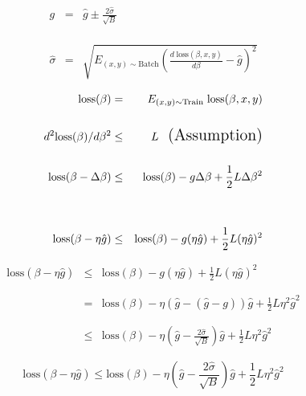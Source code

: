 {{\vfill
\begin{eqnarray*}
  g & = & \hat{g} \pm \frac{2\hat{\sigma}}{\sqrt{B}} \\
  \\
  \\
  \\
  \hat{\sigma} & = & \sqrt{E_{(x,y) \sim \mathrm{Batch}} \left(\frac{d\;\mathrm{loss}(\beta,x,y)}{d \beta} - \hat{g}\right)^2}
\end{eqnarray*}


\begin{eqnarray*}
  \mathrm{loss}(\beta) & = & E_{(x,y) \sim \mathrm{Train}}\;\mathrm{loss}(\beta,x,y) \\
  \\
  d^2 \mathrm{loss}(\beta)/d \beta^2 & \leq & L \;\;\;\mbox{\Large (Assumption)} \\
  \\
  \mathrm{loss}(\beta - \Delta\beta) & \leq & \mathrm{loss}(\beta) - g\Delta \beta + \frac{1}{2}L\Delta \beta^2 \\
  \\
  \\
  \mathrm{loss}(\beta - \eta\hat{g}) & \leq & \mathrm{loss}(\beta) - g(\eta\hat{g}) + \frac{1}{2}L(\eta\hat{g})^2
\end{eqnarray*}


\begin{eqnarray*}
  \mathrm{loss}(\beta - \eta\hat{g}) & \leq & \mathrm{loss}(\beta) - g(\eta\hat{g}) + \frac{1}{2}L(\eta\hat{g})^2 \\
  \\
  \\
  & = &  \mathrm{loss}(\beta) - \eta (\hat{g} - (\hat{g} -g)) \hat{g} + \frac{1}{2}L\eta^2 \hat{g}^2 \\
  \\
  \\
  & \leq &  \mathrm{loss}(\beta) - \eta \left(\hat{g} - \frac{2\hat{\sigma}}{\sqrt{B}}\right)\hat{g} + \frac{1}{2}L \eta^2 \hat{g}^2
\end{eqnarray*}


$$\mathrm{loss}(\beta - \eta\hat{g}) \leq \mathrm{loss}(\beta) - \eta \left(\hat{g} - \frac{2\hat{\sigma}}{\sqrt{B}} \right)\hat{g}  + \frac{1}{2}L \eta^2 \hat{g}^2$$

}}
